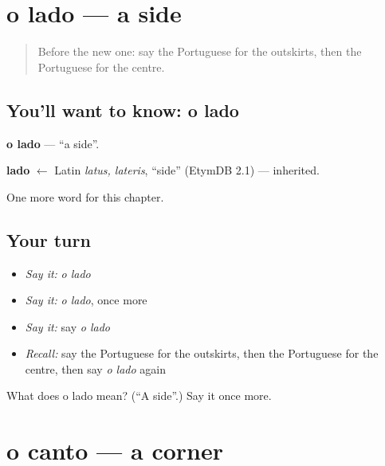 \section[o lado]{o lado — a side}

\label{lesson:PT-C183-lado}



\begin{quote}
Before the new one: say the Portuguese for the outskirts, then the Portuguese for the centre.
\end{quote}

\subsection*{You'll want to know: o lado}
\textbf{o lado} — \textquotedblleft{}a side\textquotedblright{}.

\begin{cousinweb}
\textbf{lado} $\leftarrow$ Latin \emph{latus, lateris}, \textquotedblleft{}side\textquotedblright{} (EtymDB 2.1) — inherited.
\end{cousinweb}

\begin{grammarlens}[title={What you've built}]
One more word for this chapter.
\end{grammarlens}

\subsection*{Your turn}
\begin{itemize}
\raggedright
  \item \emph{Say it:} \emph{o lado}
  \item \emph{Say it:} \emph{o lado}, once more
  \item \emph{Say it:} say \emph{o lado}
  \item \emph{Recall:} say the Portuguese for the outskirts, then the Portuguese for the centre, then say \emph{o lado} again
\end{itemize}

\begin{tcolorbox}[breakable,colback=teal!4,colframe=teal!35!black,title={Before you move on}]
What does o lado mean? (\textquotedblleft{}A side\textquotedblright{}.) Say it once more.
\end{tcolorbox}
\section[o canto]{o canto — a corner}

